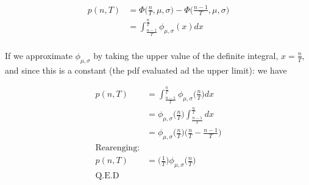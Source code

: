 \documentclass[11pt]{article}
\begin{document}
    \begin{align*}
        p(n,T) &= \Phi \Big ( \frac{n}{T}, \mu, \sigma \Big) - \Phi \Big ( \frac{n - 1}{T},\mu,\sigma \Big)\\
               &= \int_{\frac{n-1}{T}}^{\frac{n}{T}} \phi_{\mu,\sigma}(x)dx\\
    \end{align*}

    If we approximate $\phi_{\mu,\sigma}$ by taking the upper value of the definite integral, $x = \frac{n}{T}$, and
    since this is a constant (the pdf evaluated ad the upper limit): we have

    \begin{align*}
        p(n,T) &= \int_{\frac{n-1}{T}}^{\frac{n}{T}} \phi_{\mu,\sigma} \Big( \frac{n}{T} \Big)dx\\
               &= \phi_{\mu,\sigma} \Big (\frac{n}{T} \Big)\int_{\frac{n-1}{T}}^{\frac{n}{T}}dx \\
               &= \phi_{\mu,\sigma} \Big (\frac{n}{T} \Big) \Big (\frac{n}{T} - \frac{n-1}{T} \Big) \\
        \text{Rearenging:} \\
        p(n,T)  &= \Big (\frac{1}{T} \Big) \phi_{\mu,\sigma}  \Big (\frac{n}{T} \Big) \\
        \text{Q.E.D}
    \end{align*}

%
\end{document}
